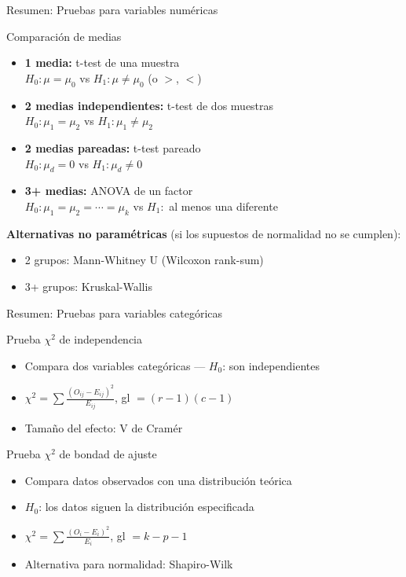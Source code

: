\documentclass[aspectratio=169, 11pt]{beamer}
\begin{document}
\begin{frame}{Resumen: Pruebas para variables numéricas}
\begin{block}{Comparación de medias}
\begin{itemize}
  \item \textbf{1 media:} t-test de una muestra\\
    $H_0: \mu = \mu_0$ vs $H_1: \mu \neq \mu_0$ (o $>$, $<$)

  \item \textbf{2 medias independientes:} t-test de dos muestras\\
    $H_0: \mu_1 = \mu_2$ vs $H_1: \mu_1 \neq \mu_2$

  \item \textbf{2 medias pareadas:} t-test pareado\\
    $H_0: \mu_d = 0$ vs $H_1: \mu_d \neq 0$

  \item \textbf{3+ medias:} ANOVA de un factor\\
    $H_0: \mu_1 = \mu_2 = \cdots = \mu_k$ vs $H_1:$ al menos una diferente
\end{itemize}
\end{block}

\vspace{0.2cm}
\textbf{Alternativas no paramétricas} (si los supuestos de normalidad no se cumplen):
\begin{itemize}
  \item 2 grupos: Mann-Whitney U (Wilcoxon rank-sum)
  \item 3+ grupos: Kruskal-Wallis
\end{itemize}
\end{frame}

\begin{frame}{Resumen: Pruebas para variables categóricas}
\begin{block}{Prueba $\chi^2$ de independencia}
\begin{itemize}
  \item Compara dos variables categóricas --- $H_0$: son independientes
  \item $\chi^2 = \sum \frac{(O_{ij} - E_{ij})^2}{E_{ij}}$, \; gl $= (r-1)(c-1)$
  \item Tamaño del efecto: V de Cramér
\end{itemize}
\end{block}

\begin{block}{Prueba $\chi^2$ de bondad de ajuste}
\begin{itemize}
  \item Compara datos observados con una distribución teórica
  \item $H_0$: los datos siguen la distribución especificada
  \item $\chi^2 = \sum \frac{(O_i - E_i)^2}{E_i}$, \; gl $= k - p - 1$
  \item Alternativa para normalidad: Shapiro-Wilk
\end{itemize}
\end{block}
\end{frame}
\end{document}

